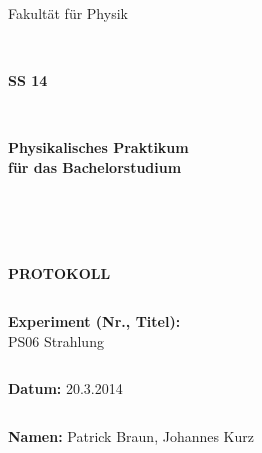 \documentclass[12pt,a4paper]{article}
\begin{document}
\thispagestyle{empty}
			\begin{center}
			\Large{Fakultät für Physik}\\
			\end{center}
\begin{verbatim}


\end{verbatim}
			\begin{center}
			\textbf{\LARGE SS 14}
			\end{center}
\begin{verbatim}


\end{verbatim}
			\begin{center}
			\textbf{\LARGE{Physikalisches Praktikum\\ für das Bachelorstudium}}
			\end{center}
\begin{verbatim}




\end{verbatim}

			\begin{center}
			\textbf{\LARGE{PROTOKOLL}}
			\end{center}
			
\begin{verbatim}

\end{verbatim}

			\begin{flushleft}
			\textbf{\Large{Experiment (Nr., Titel):}}\\
			\LARGE{PS06 Strahlung}	
			\end{flushleft}

\begin{verbatim}

\end{verbatim}	
			\begin{flushleft}
			\textbf{\Large{Datum:}} \Large{20.3.2014}
			\end{flushleft}
			
\begin{verbatim}
\end{verbatim}
		\begin{flushleft}
			\textbf{\Large{Namen:}} \Large{Patrick Braun, Johannes Kurz}
			\end{flushleft}
\end{document}
